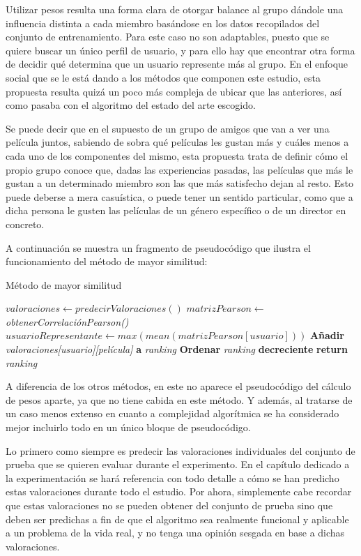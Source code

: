 Utilizar pesos resulta una forma clara de otorgar balance al grupo dándole una influencia distinta a cada miembro basándose en los datos recopilados del conjunto de entrenamiento. Para este caso no son adaptables, puesto que se quiere buscar un único perfil de usuario, y para ello hay que encontrar otra forma de decidir qué determina que un usuario represente más al grupo. En el enfoque social que se le está dando a los métodos que componen este estudio, esta propuesta resulta quizá un poco más compleja de ubicar que las anteriores, así como pasaba con el algoritmo del estado del arte escogido.

Se puede decir que en el supuesto de un grupo de amigos que van a ver una película juntos, sabiendo de sobra qué películas les gustan más y cuáles menos a cada uno de los componentes del mismo, esta propuesta trata de definir cómo el propio grupo conoce que, dadas las experiencias pasadas, las películas que más le gustan a un determinado miembro son las que más satisfecho dejan al resto. Esto puede deberse a mera casuística, o puede tener un sentido particular, como que a dicha persona le gusten las películas de un género específico o de un director en concreto.

A continuación se muestra un fragmento de pseudocódigo que ilustra el funcionamiento del método de mayor similitud:

\begin{algorithm}
	\caption{Método de mayor similitud}
	\begin{algorithmic}[1]
		\State $valoraciones \gets predecirValoraciones()$
		\State $matrizPearson \gets $ \textit{obtenerCorrelaciónPearson()}
		\State $usuarioRepresentante \gets max(mean(matrizPearson[usuario]))$
		\State \textbf{Añadir} \textit{valoraciones[usuario][película]} \textbf{a} \textit{ranking}
		\EndFor
		\State \textbf{Ordenar} \textit{ranking} \textbf{decreciente}
		\State \textbf{return} \textit{ranking}
	\end{algorithmic}
\end{algorithm}

A diferencia de los otros métodos, en este no aparece el pseudocódigo del cálculo de pesos aparte, ya que no tiene cabida en este método. Y además, al tratarse de un caso menos extenso en cuanto a complejidad algorítmica se ha considerado mejor incluirlo todo en un único bloque de pseudocódigo.

Lo primero como siempre es predecir las valoraciones individuales del conjunto de prueba que se quieren evaluar durante el experimento. En el capítulo dedicado a la experimentación se hará referencia con todo detalle a cómo se han predicho estas valoraciones durante todo el estudio. Por ahora, simplemente cabe recordar que estas valoraciones no se pueden obtener del conjunto de prueba sino que deben ser predichas a fin de que el algoritmo sea realmente funcional y aplicable a un problema de la vida real, y no tenga una opinión sesgada en base a dichas valoraciones.

